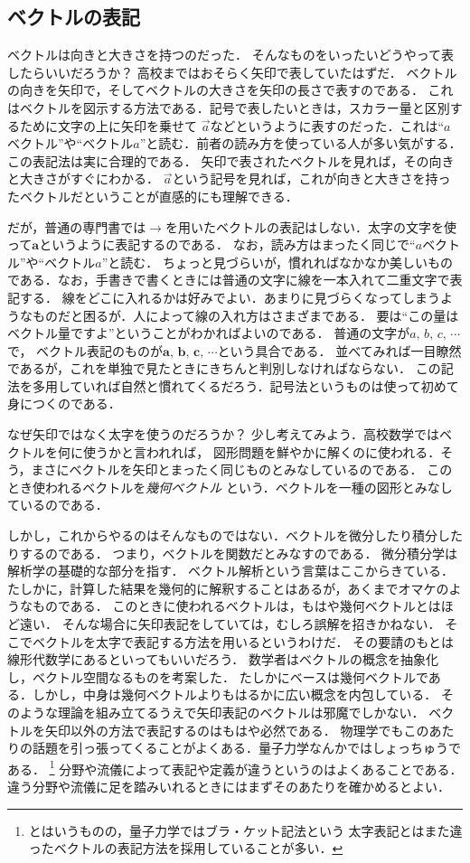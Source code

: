 \subsection{ベクトルの表記}
ベクトルは向きと大きさを持つのだった．
そんなものをいったいどうやって表したらいいだろうか？ 高校まではおそらく矢印で表していたはずだ．
ベクトルの向きを矢印で，そしてベクトルの大きさを矢印の長さで表すのである．
これはベクトルを図示する方法である．記号で表したいときは，スカラー量と区別するために文字の上に矢印を乗せて
$\vec{a}$などというように表すのだった．これは``$a$ベクトル''や``ベクトル$a$''と読む．前者の読み方を使っている人が多い気がする．
この表記法は実に合理的である．
矢印で表されたベクトルを見れば，その向きと大きさがすぐにわかる．
$\vec{a}$という記号を見れば，これが向きと大きさを持ったベクトルだということが直感的にも理解できる．

だが，普通の専門書では$\to$を用いたベクトルの表記はしない．太字の文字を使って$\bm{a}$というように表記するのである．
なお，読み方はまったく同じで``$a$ベクトル''や``ベクトル$a$''と読む．
ちょっと見づらいが，慣れればなかなか美しいものである．なお，手書きで書くときには普通の文字に線を一本入れて二重文字で表記する．
線をどこに入れるかは好みでよい．あまりに見づらくなってしまうようなものだと困るが．人によって線の入れ方はさまざまである．
要は``この量はベクトル量ですよ''ということがわかればよいのである．
普通の文字が$a, \, b, \, c, \, \cdots$で，
ベクトル表記のものが$\bm{a}, \, \bm{b}, \, \bm{c}, \, \cdots$という具合である．
並べてみれば一目瞭然であるが，これを単独で見たときにきちんと判別しなければならない．
この記法を多用していれば自然と慣れてくるだろう．記号法というものは使って初めて身につくのである．

なぜ矢印ではなく太字を使うのだろうか？ 少し考えてみよう．高校数学ではベクトルを何に使うかと言われれば，
図形問題を鮮やかに解くのに使われる．そう，まさにベクトルを矢印とまったく同じものとみなしているのである．
このとき使われるベクトルを\emph{幾何ベクトル}
という．ベクトルを一種の図形とみなしているのである．

しかし，これからやるのはそんなものではない．ベクトルを微分したり積分したりするのである．
つまり，ベクトルを関数だとみなすのである．
微分積分学は解析学の基礎的な部分を指す．
ベクトル解析という言葉はここからきている．
たしかに，計算した結果を幾何的に解釈することはあるが，あくまでオマケのようなものである．
このときに使われるベクトルは，もはや幾何ベクトルとはほど遠い．
そんな場合に矢印表記をしていては，むしろ誤解を招きかねない．
そこでベクトルを太字で表記する方法を用いるというわけだ．
その要請のもとは線形代数学にあるといってもいいだろう．
数学者はベクトルの概念を抽象化し，ベクトル空間なるものを考案した．
たしかにベースは幾何ベクトルである．しかし，中身は幾何ベクトルよりもはるかに広い概念を内包している．
そのような理論を組み立てるうえで矢印表記のベクトルは邪魔でしかない．
ベクトルを矢印以外の方法で表記するのはもはや必然である．
物理学でもこのあたりの話題を引っ張ってくることがよくある．量子力学なんかではしょっちゅうである．
\footnote{とはいうものの，量子力学ではブラ・ケット記法という
太字表記とはまた違ったベクトルの表記方法を採用していることが多い．}
分野や流儀によって表記や定義が違うというのはよくあることである．
違う分野や流儀に足を踏みいれるときにはまずそのあたりを確かめるとよい．

